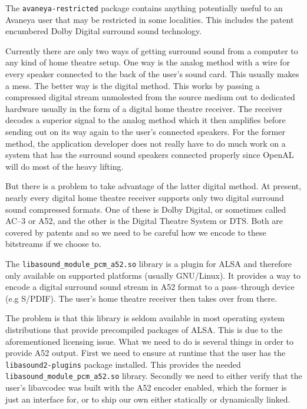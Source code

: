 
The {\tt avaneya-restricted} package contains anything potentially useful to an Avaneya user that may be restricted in some localities. This includes the patent encumbered Dolby Digital surround sound technology.

Currently there are only two ways of getting surround sound from a computer to any kind of home theatre setup. One way is the analog method with a wire for every speaker connected to the back of the user's sound card. This usually makes a mess. The better way is the digital method. This works by passing a compressed digital stream unmolested from the source medium out to dedicated hardware usually in the form of a digital home theatre receiver. The receiver decodes a superior signal to the analog method which it then amplifies before sending out on its way again to the user's connected speakers. For the former method, the application developer does not really have to do much work on a system that has the surround sound speakers connected properly since OpenAL will do most of the heavy lifting.

But there is a problem to take advantage of the latter digital method. At present, nearly every digital home theatre receiver supports only two digital surround sound compressed formats. One of these is Dolby Digital, or sometimes called AC--3 or A52, and the other is the Digital Theatre System or DTS. Both are covered by patents and so we need to be careful how we encode to these bitstreams if we choose to. 

The {\tt libasound_module_pcm_a52.so} library is a plugin for ALSA and therefore only available on supported platforms (usually GNU/Linux). It provides a way to encode a digital surround sound stream in A52 format to a pass--through device (e.g S/PDIF). The user's home theatre receiver then takes over from there. 

The problem is that this library is seldom available in most operating system distributions that provide precompiled packages of ALSA. This is due to the aforementioned licensing issue. What we need to do is several things in order to provide A52 output. First we need to ensure at runtime that the user has the {\tt libasound2-plugins} package installed. This provides the needed {\tt libasound_module_pcm_a52.so} library. Secondly we need to either verify that the user's libavcodec was built with the A52 encoder enabled, which the former is just an interface for, or to ship our own either statically or dynamically linked. 

